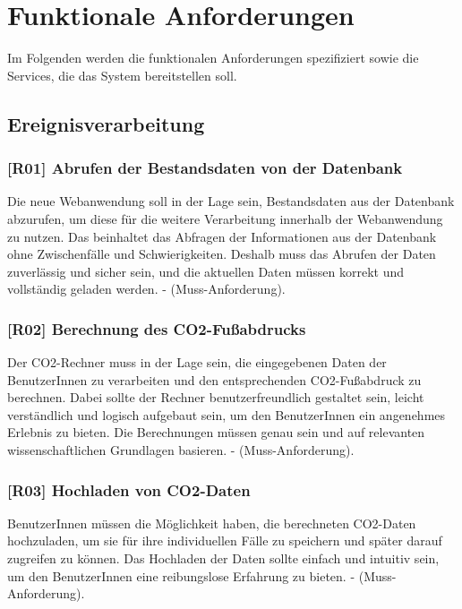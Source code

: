 \section{Funktionale Anforderungen}
\label{chapter:5-section:funktionale-anforderungen}

Im Folgenden werden die funktionalen Anforderungen spezifiziert sowie die Services, die das System bereitstellen soll.

\subsection{Ereignisverarbeitung}

\subsubsection{[R01] Abrufen der Bestandsdaten von der Datenbank}

Die neue Webanwendung soll in der Lage sein, Bestandsdaten aus der Datenbank abzurufen, um diese für die weitere Verarbeitung innerhalb der Webanwendung zu nutzen. Das beinhaltet das Abfragen der Informationen aus der Datenbank ohne Zwischenfälle und Schwierigkeiten. Deshalb muss das Abrufen der Daten zuverlässig und sicher sein, und die aktuellen Daten müssen korrekt und vollständig geladen werden. - (Muss-Anforderung).

\subsubsection{[R02] Berechnung des CO2-Fußabdrucks}

Der CO2-Rechner muss in der Lage sein, die eingegebenen Daten der BenutzerInnen zu verarbeiten und den entsprechenden CO2-Fußabdruck zu berechnen. Dabei sollte der Rechner benutzerfreundlich gestaltet sein, leicht verständlich und logisch aufgebaut sein, um den BenutzerInnen ein angenehmes Erlebnis zu bieten. Die Berechnungen müssen genau sein und auf relevanten wissenschaftlichen Grundlagen basieren. - (Muss-Anforderung).

\subsubsection{[R03] Hochladen von CO2-Daten}

BenutzerInnen müssen die Möglichkeit haben, die berechneten CO2-Daten hochzuladen, um sie für ihre individuellen Fälle zu speichern und später darauf zugreifen zu können. Das Hochladen der Daten sollte einfach und intuitiv sein, um den BenutzerInnen eine reibungslose Erfahrung zu bieten. - (Muss-Anforderung).

